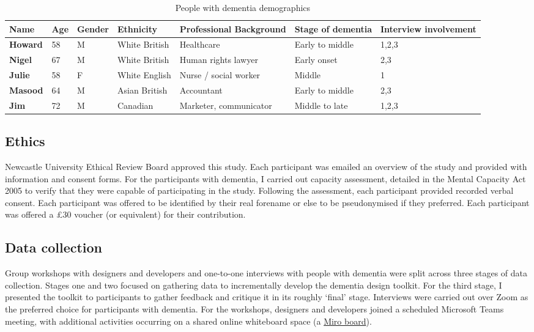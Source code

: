 \begin{table}[!ht]
\centering

\begin{tabularx}{\textwidth}{@{} YYYYYYY @{}}
\textbf{Name} & \textbf{Age} & \textbf{Gender} & \textbf{Ethnicity} & \textbf{Professional Background} & \textbf{Stage of dementia} & \textbf{Interview involvement} \\ \hline
\textbf{Howard} & 58 & M & White British & Healthcare             & Early to middle & 1,2,3 \\
\textbf{Nigel}  & 67 & M & White British & Human rights lawyer    & Early onset     & 2,3   \\
\textbf{Julie}  & 58 & F & White English & Nurse / social worker  & Middle          & 1     \\
\textbf{Masood} & 64 & M & Asian British & Accountant             & Early to middle & 2,3   \\
\textbf{Jim}    & 72 & M & Canadian      & Marketer, communicator & Middle to late  & 1,2,3
\end{tabularx}
\caption{People with dementia demographics}
\label{tab:DementiaDemographic}
\end{table}

\subsection{Ethics}
Newcastle University Ethical Review Board approved this study. Each participant was emailed an overview of the study and provided with information and consent forms. For the participants with dementia, I carried out capacity assessment, detailed in the Mental Capacity Act 2005 \citep{oyebode_mental_2005} to verify that they were capable of participating in the study. Following the assessment, each participant provided recorded verbal consent. Each participant was offered to be identified by their real forename or else to be pseudonymised if they preferred. Each participant was offered a £30 voucher (or equivalent) for their contribution.

\subsection{Data collection}
Group workshops with designers and developers and one-to-one interviews with people with dementia were split across three stages of data collection. Stages one and two focused on gathering data to incrementally develop the dementia design toolkit. For the third stage, I presented the toolkit to participants to gather feedback and critique it in its roughly `final' stage.  Interviews were carried out over Zoom as the preferred choice for participants with dementia. For the workshops, designers and developers joined a scheduled Microsoft Teams meeting, with additional activities occurring on a shared online whiteboard space (a \href{https://miro.com}{Miro board}). 

